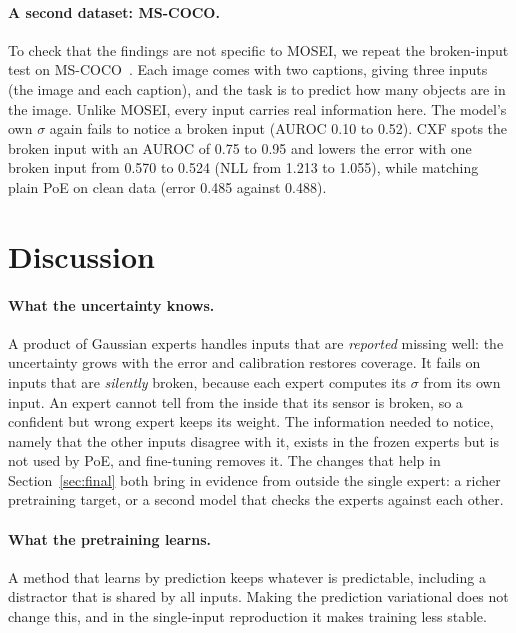 \documentclass[10pt,twocolumn]{article}
\begin{document}
\paragraph{A second dataset: MS-COCO.} To check that the findings are not specific to MOSEI, we repeat the broken-input
test on MS-COCO~\cite{lin2014coco}. Each image comes with two captions, giving three inputs (the image and each caption),
and the task is to predict how many objects are in the image. Unlike MOSEI, every input carries real information here.
The model's own $\sigma$ again fails to notice a broken input (AUROC 0.10 to 0.52). CXF spots the broken input with an
AUROC of 0.75 to 0.95 and lowers the error with one broken input from 0.570 to 0.524 (NLL from 1.213 to 1.055), while
matching plain PoE on clean data (error 0.485 against 0.488).

\section{Discussion}
\paragraph{What the uncertainty knows.} A product of Gaussian experts handles inputs that are \emph{reported} missing
well: the uncertainty grows with the error and calibration restores coverage. It fails on inputs that are
\emph{silently} broken, because each expert computes its $\sigma$ from its own input. An expert cannot tell from the
inside that its sensor is broken, so a confident but wrong expert keeps its weight. The information needed to notice,
namely that the other inputs disagree with it, exists in the frozen experts but is not used by PoE, and fine-tuning
removes it. The changes that help in Section~\ref{sec:final} both bring in evidence from outside the single expert: a richer
pretraining target, or a second model that checks the experts against each other.

\paragraph{What the pretraining learns.} A method that learns by prediction keeps whatever is predictable, including a
distractor that is shared by all inputs. Making the prediction variational does not change this, and in the
single-input reproduction it makes training less stable.
\end{document}
